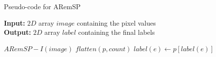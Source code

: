 \begin{algorithm}[ht]
\small
{
	\caption{Pseudo-code for ARemSP}
	\label{alg:ARemSP}
	\textbf{Input:} $2D$ array $image$ containing the pixel values \\
	\textbf{Output:} $2D$ array $label$ containing the final labels
	\begin{algorithmic}[1]
		\State $ARemSP-I(image)$ 
		\State $flatten(p,count)$ 
		  
				\State $label(e) \gets p[label(e)]$
			\EndFor
		\EndFor		
	\EndFunction
	\end{algorithmic}	
}
\end{algorithm}

